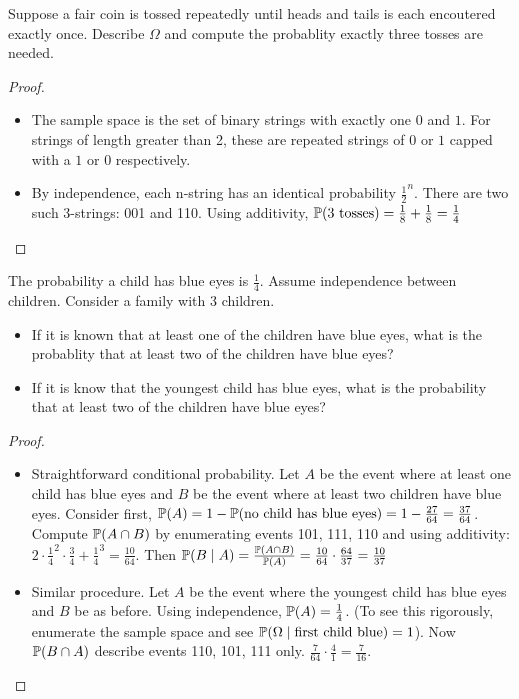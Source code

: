 \documentclass[10pt]{article}
\begin{document}
\setcounter{exercise}{12}
\begin{exercise}
    Suppose a fair coin is tossed repeatedly until heads and tails is each
    encoutered exactly once. Describe $\Omega$ and compute the probablity
    exactly three tosses are needed.
\end{exercise}
\begin{proof}
    \begin{itemize}
        \item{The sample space is the set of binary strings with exactly one
            $0$ and $1$. For strings of length greater than 2, these are
        repeated strings of $0$ or $1$ capped with a $1$ or $0$ respectively.}
    \item{By independence, each n-string has an identical probability
        $\frac{1}{2}^n$. There are two such 3-strings: 001 and 110. Using additivity,
    $\P(\text{3 tosses}) = \frac{1}{8} + \frac{1}{8} = \frac{1}{4}$}
    \end{itemize}
\end{proof}

\setcounter{exercise}{14}
\begin{exercise}
    The probability a child has blue eyes is $\frac{1}{4}$. Assume independence
    between children. Consider a family with 3 children.
    \begin{itemize}
        \item{If it is known that at least one of the children have blue eyes,
            what is the probablity that at least two of the children have blue
        eyes?}
    \item{If it is know that the youngest child has blue eyes, what is the
        probability that at least two of the children have blue eyes?}
    \end{itemize}
\end{exercise}
\begin{proof}
    \begin{itemize}
        \item{Straightforward conditional probability. Let $A$ be the event
                where at least one child has blue eyes and $B$ be the event
                where at least two children have blue eyes. Consider first,
                $\P(A) = 1 - \P(\text{no child has blue eyes}) =
                1 - \frac{27}{64} = \frac{37}{64}$. Compute $\P(A\cap B)$ by
                enumerating events 101, 111, 110 and using additivity: $2\cdot
                \frac{1}{4}^2\cdot\frac{3}{4} + \frac{1}{4}^3 = \frac{10}{64}$. Then $\P(B\mid A) = \frac{\P(A
            \cap B)}{\P(A)} = \frac{10}{64}\cdot\frac{64}{37} = \frac{10}{37}$}
        \item{Similar procedure. Let $A$ be the event where the youngest child
            has blue eyes and $B$ be as before. Using independence, $\P(A) =
        \frac{1}{4}$. (To see this rigorously, enumerate the sample space and
    see $\P(\Omega\mid \text{first child blue}) = 1$). Now $\P(B \cap A)$
    describe events 110, 101, 111 only. $\frac{7}{64}\cdot\frac{4}{1} =
\frac{7}{16}$.}
    \end{itemize}
\end{proof}
\end{document}
